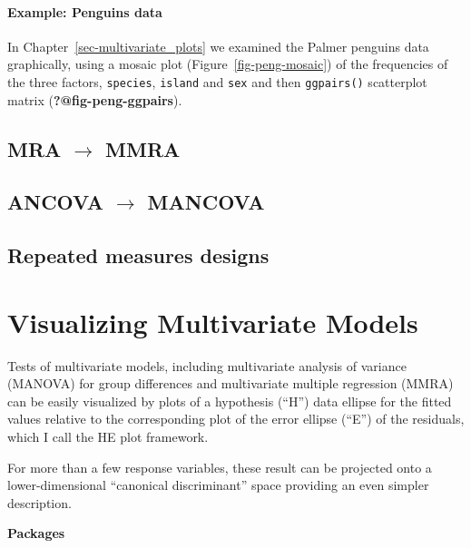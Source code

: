 \documentclass[
  letterpaper,
  10pt,
  krantz2]{krantz}
\begin{document}
\subsubsection*{Example: Penguins data}\label{example-penguins-data}

In Chapter~\ref{sec-multivariate_plots} we examined the Palmer penguins
data graphically, using a mosaic plot (Figure~\ref{fig-peng-mosaic}) of
the frequencies of the three factors, \texttt{species}, \texttt{island}
and \texttt{sex} and then \texttt{ggpairs()} scatterplot matrix
(\textbf{?@fig-peng-ggpairs}).

\section{\texorpdfstring{MRA \(\rightarrow\)
MMRA}{MRA \textbackslash rightarrow MMRA}}\label{mra-rightarrow-mmra}

\section{\texorpdfstring{ANCOVA \(\rightarrow\)
MANCOVA}{ANCOVA \textbackslash rightarrow MANCOVA}}\label{ancova-rightarrow-mancova}

\section{Repeated measures designs}\label{repeated-measures-designs}


\chapter{Visualizing Multivariate Models}\label{sec-vis-mlm}

Tests of multivariate models, including multivariate analysis of
variance (MANOVA) for group differences and multivariate multiple
regression (MMRA) can be easily visualized by plots of a hypothesis
(``H'') data ellipse for the fitted values relative to the corresponding
plot of the error ellipse (``E'') of the residuals, which I call the HE
plot framework.

For more than a few response variables, these result can be projected
onto a lower-dimensional ``canonical discriminant'' space providing an
even simpler description.

\textbf{Packages}
\end{document}
